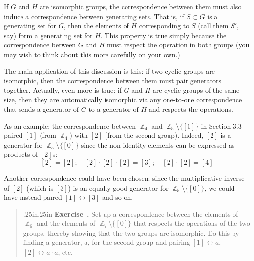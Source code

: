 \documentclass[12 pt]{article}
\newtheorem{remark}{Remark}
\DeclareMathOperator{\Z}{\mathbb{Z}}
\newcounter{exercise}[section]
\newenvironment{exercise}{\refstepcounter{exercise}\par\bigskip \begin{quotation}{}{\leftmargin .25in\rightmargin .25in}
	\noindent \textbf{Exercise~\thesection.\theexercise }  \rmfamily}{\end{quotation}\par\bigskip}
\begin{document}
If $G$ and $H$ are isomorphic groups, the correspondence between them must also induce a correspondence between generating sets. That is, if $S\subset G$ is a generating set for $G$, then the elements of $H$ corresponding to $S$ (call them $S'$, say) form a generating set for $H$. This property is true simply because the correspondence between $G$ and $H$ must respect the operation in both groups (you may wish to think about this more carefully on your own.) 

The main application of this discussion is this: if two cyclic groups are isomorphic, then the correspondence between them must pair generators together. Actually, even more is true: if $G$ and $H$ are cyclic groups of the same size, then they are automatically isomorphic via any one-to-one correspondence that sends a generator of $G$ to a generator of $H$ and respects the operations. 

As an example: the correspondence between $\Z_4$ and $\Z_5\setminus\{[0]\}$ in Section 3.3 paired $[1]$ (from $\Z_4$) with $[2]$ (from the second group). Indeed, $[2]$ is a generator for $\Z_5\setminus\{[0]\}$ since the non-identity elements can be expressed as products of $[2]$s:
$$
[2]=[2]; \quad [2]\cdot[2]\cdot[2]=[3]; \quad [2]\cdot[2]=[4]
$$

Another correspondence could have been chosen: since the multiplicative inverse of $[2]$ (which is $[3]$) is an equally good generator for $\Z_5\setminus\{[0]\}$, we could have instead paired $[1]\leftrightarrow [3]$ and so on. 

\begin{exercise}
Set up a correspondence between the elements of $\Z_6$ and the elements of $\Z_7\setminus\{[0]\}$ that respects the operations of the two groups, thereby showing that the two groups are isomorphic. Do this by finding a generator, $a$, for the second group and pairing $[1]\leftrightarrow a$, $[2]\leftrightarrow a\cdot a$, etc. 
\end{exercise}


\end{document}
